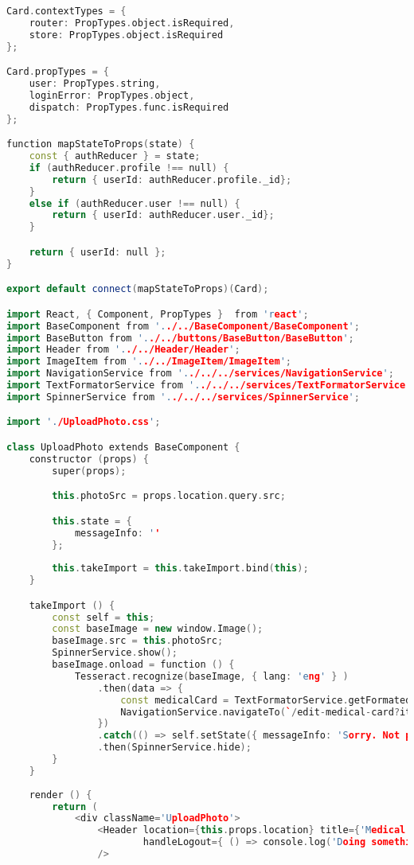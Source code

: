 \begin{lstlisting}[language=C++, style=cplusplusstyle]
Card.contextTypes = {
    router: PropTypes.object.isRequired,
    store: PropTypes.object.isRequired
};

Card.propTypes = {
    user: PropTypes.string,
    loginError: PropTypes.object,
    dispatch: PropTypes.func.isRequired
};

function mapStateToProps(state) {
    const { authReducer } = state;
    if (authReducer.profile !== null) {
        return { userId: authReducer.profile._id};
    }
    else if (authReducer.user !== null) {
        return { userId: authReducer.user._id};
    }

    return { userId: null };
}

export default connect(mapStateToProps)(Card);

import React, { Component, PropTypes }  from 'react';
import BaseComponent from '../../BaseComponent/BaseComponent';
import BaseButton from '../../buttons/BaseButton/BaseButton';
import Header from '../../Header/Header';
import ImageItem from '../../ImageItem/ImageItem';
import NavigationService from '../../../services/NavigationService';
import TextFormatorService from '../../../services/TextFormatorService';
import SpinnerService from '../../../services/SpinnerService';

import './UploadPhoto.css';

class UploadPhoto extends BaseComponent {
    constructor (props) {
        super(props);

        this.photoSrc = props.location.query.src;

        this.state = {
            messageInfo: ''
        };
        
        this.takeImport = this.takeImport.bind(this);
    }

    takeImport () {
        const self = this;
        const baseImage = new window.Image();
        baseImage.src = this.photoSrc;
        SpinnerService.show();
        baseImage.onload = function () {
            Tesseract.recognize(baseImage, { lang: 'eng' } )
                .then(data => {
                    const medicalCard = TextFormatorService.getFormatedMedicalCardObject(data.lines);
                    NavigationService.navigateTo(`/edit-medical-card?item=${JSON.stringify(medicalCard)}`);
                })
                .catch(() => self.setState({ messageInfo: 'Sorry. Not parsed upload photo. Try again!' }))
                .then(SpinnerService.hide);
        }
    }
    
    render () {
        return (
            <div className='UploadPhoto'>
                <Header location={this.props.location} title={'Medical Card Info'} isMainPage={false}
                        handleLogout={ () => console.log('Doing something') }
                />


\end{lstlisting}
